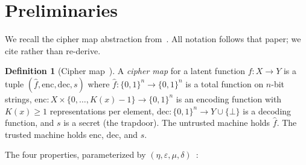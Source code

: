 \documentclass[11pt]{article}
\theoremstyle{definition}
\newtheorem{definition}{Definition}[section]
\theoremstyle{plain}
\theoremstyle{remark}
\newcommand{\fhat}{\hat{f}}
\newcommand{\enc}{\mathrm{enc}}
\newcommand{\dec}{\mathrm{dec}}
\newcommand{\B}{\{0,1\}}
\begin{document}
\section{Preliminaries}
\label{sec:prelim}

We recall the cipher map abstraction from~\cite{towell2026cipher}.  All
notation follows that paper; we cite rather than re-derive.

\begin{definition}[Cipher map~{\cite[Def.~3.1]{towell2026cipher}}]
\label{def:cipher-map}
A \emph{cipher map} for a latent function $f : X \to Y$ is a tuple
$(\fhat, \enc, \dec, s)$ where $\fhat : \B^n \to \B^n$ is a total
function on $n$-bit strings, $\enc : X \times \{0,\ldots,K(x){-}1\}
\to \B^n$ is an encoding function with $K(x) \geq 1$ representations
per element, $\dec : \B^n \to Y \cup \{\bot\}$ is a decoding function,
and $s$ is a secret (the trapdoor).  The untrusted machine holds $\fhat$.
The trusted machine holds $\enc$, $\dec$, and $s$.
\end{definition}

The four properties, parameterized by
$(\eta, \varepsilon, \mu, \delta)$~\cite[Sec.~4]{towell2026cipher}:
\end{document}
